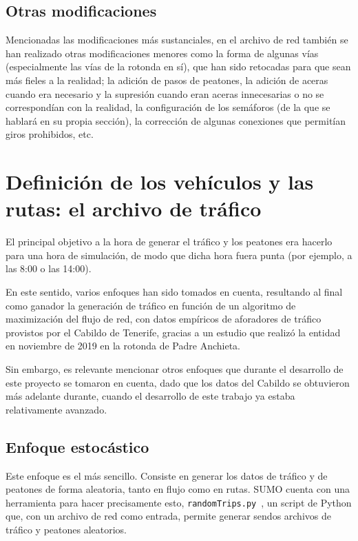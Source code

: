 \subsection{Otras modificaciones}

Mencionadas las modificaciones más sustanciales, en el archivo de red también se han realizado otras modificaciones menores como la forma de algunas vías (especialmente las vías de la rotonda en sí), que han sido retocadas para que sean más fieles a la realidad; la adición de pasos de peatones, la adición de aceras cuando era necesario y la supresión cuando eran aceras innecesarias o no se correspondían con la realidad, la configuración de los semáforos (de la que se hablará en su propia sección), la corrección de algunas conexiones que permitían giros prohibidos, etc.

\section{Definición de los vehículos y las rutas: el archivo de tráfico}
\label{sec:vehiculos}

El principal objetivo a la hora de generar el tráfico y los peatones era hacerlo para una hora de simulación, de modo que dicha hora fuera punta (por ejemplo, a las 8:00 o las 14:00).

En este sentido, varios enfoques han sido tomados en cuenta, resultando al final como ganador la generación de tráfico en función de un algoritmo de maximización del flujo de red, con datos empíricos de aforadores de tráfico provistos por el Cabildo de Tenerife, gracias a un estudio que realizó la entidad en noviembre de 2019 en la rotonda de Padre Anchieta. 

Sin embargo, es relevante mencionar otros enfoques que durante el desarrollo de este proyecto se tomaron en cuenta, dado que los datos del Cabildo se obtuvieron más adelante durante, cuando el desarrollo de este trabajo ya estaba relativamente avanzado.

\subsection{Enfoque estocástico}
\label{enfoque_estocastico}

Este enfoque es el más sencillo. Consiste en generar los datos de tráfico y de peatones de forma aleatoria, tanto en flujo como en rutas. SUMO cuenta con una herramienta para hacer precisamente esto, \texttt{randomTrips.py}~\cite{noauthor_randomtripspy_nodate}, un script de Python que, con un archivo de red como entrada, permite generar sendos archivos de tráfico y peatones aleatorios.

